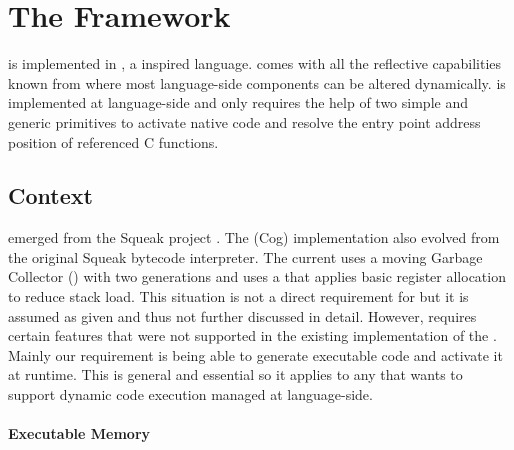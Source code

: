 \section{The \B Framework}
\B is implemented in , a \ST inspired language.
\PH comes with all the reflective capabilities known from \ST where most lan\-guage-side components can be altered dynamically.
\B is implemented at lan\-guage-side and only requires the help of two simple and generic primitives to activate native code and resolve the entry point address position of referenced C functions.

\subsection{\VM Context}
\PH emerged from the Squeak project \cite{Inga97a}.
The \PH \VM (Cog) implementation \cite{Mira11a} also evolved from the original Squeak bytecode interpreter.
The current \VM uses a moving Garbage Collector (\GC) with two generations and uses a \JIT that applies basic register allocation to reduce stack load. 
This situation is not a direct requirement for \B but it is assumed as given and thus not further discussed in detail.
However, \B requires certain features that were not supported in the existing implementation of the \Cog \VM.
Mainly our requirement is being able to generate executable code and activate it at runtime.
This is general and essential so it applies to any \VM that wants to support dynamic code execution managed at language-side.

\paragraph{Executable Memory}
 
